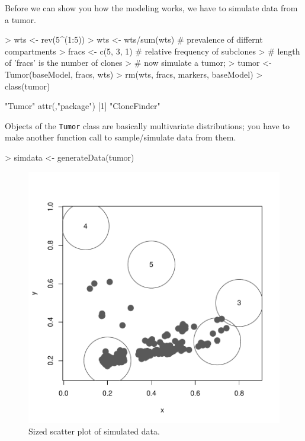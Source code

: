 \documentclass{article}
\begin{document}
Before we can show you how the modeling works, we have to simulate
data from a tumor.
\begin{Schunk}
\begin{Sinput}
> wts <- rev(5^(1:5))
> wts <- wts/sum(wts)  # prevalence of differnt compartments
> fracs <- c(5, 3, 1)  # relative frequency of subclones
> # length of 'fracs' is the number of clones
> # now simulate a tumor;
> tumor <- Tumor(baseModel, fracs, wts)
> rm(wts, fracs, markers, baseModel)
> class(tumor)
\end{Sinput}
\begin{Soutput}
[1] "Tumor"
attr(,"package")
[1] "CloneFinder"
\end{Soutput}
\end{Schunk}
Objects of the \texttt{Tumor} class are basically multivariate
distributions; you have to make another function call to
sample/simulate data from them.
\begin{Schunk}
\begin{Sinput}
> simdata <- generateData(tumor)
\end{Sinput}
\end{Schunk}
\begin{figure}
\includegraphics{cloneFinder-006}
\caption{Sized scatter plot of simulated data.}
\label{sizeplot}
\end{figure}
\end{document}
